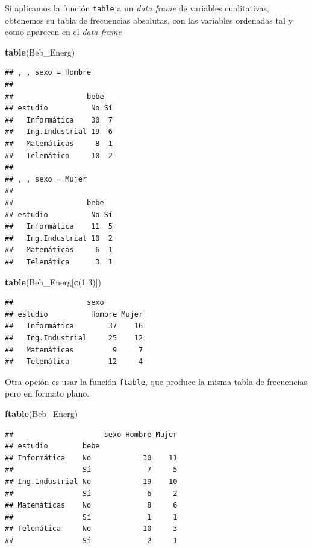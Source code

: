 \documentclass[]{book}
\newenvironment{Shaded}{\begin{snugshade}}{\end{snugshade}}
\newcommand{\DecValTok}[1]{\textcolor[rgb]{0.00,0.00,0.81}{#1}}
\newcommand{\KeywordTok}[1]{\textcolor[rgb]{0.13,0.29,0.53}{\textbf{#1}}}
\newcommand{\NormalTok}[1]{#1}
\theoremstyle{definition}
\theoremstyle{definition}
\theoremstyle{definition}
\theoremstyle{remark}
\begin{document}
Si aplicamos la función \texttt{table} a un \emph{data frame} de variables cualitativas, obtenemos su tabla de frecuencias absolutas, con las variables ordenadas tal y como aparecen en el \emph{data frame}

\begin{Shaded}
\begin{Highlighting}[]
\KeywordTok{table}\NormalTok{(Beb_Energ)}
\end{Highlighting}
\end{Shaded}

\begin{verbatim}
## , , sexo = Hombre
## 
##                 bebe
## estudio          No Sí
##   Informática    30  7
##   Ing.Industrial 19  6
##   Matemáticas     8  1
##   Telemática     10  2
## 
## , , sexo = Mujer
## 
##                 bebe
## estudio          No Sí
##   Informática    11  5
##   Ing.Industrial 10  2
##   Matemáticas     6  1
##   Telemática      3  1
\end{verbatim}

\begin{Shaded}
\begin{Highlighting}[]
\KeywordTok{table}\NormalTok{(Beb_Energ[}\KeywordTok{c}\NormalTok{(}\DecValTok{1}\NormalTok{,}\DecValTok{3}\NormalTok{)])}
\end{Highlighting}
\end{Shaded}

\begin{verbatim}
##                 sexo
## estudio          Hombre Mujer
##   Informática        37    16
##   Ing.Industrial     25    12
##   Matemáticas         9     7
##   Telemática         12     4
\end{verbatim}

Otra opción es usar la función \texttt{ftable}, que produce la misma tabla de frecuencias pero en formato plano.

\begin{Shaded}
\begin{Highlighting}[]
\KeywordTok{ftable}\NormalTok{(Beb_Energ)}
\end{Highlighting}
\end{Shaded}

\begin{verbatim}
##                     sexo Hombre Mujer
## estudio        bebe                  
## Informática    No            30    11
##                Sí             7     5
## Ing.Industrial No            19    10
##                Sí             6     2
## Matemáticas    No             8     6
##                Sí             1     1
## Telemática     No            10     3
##                Sí             2     1
\end{verbatim}
\end{document}
